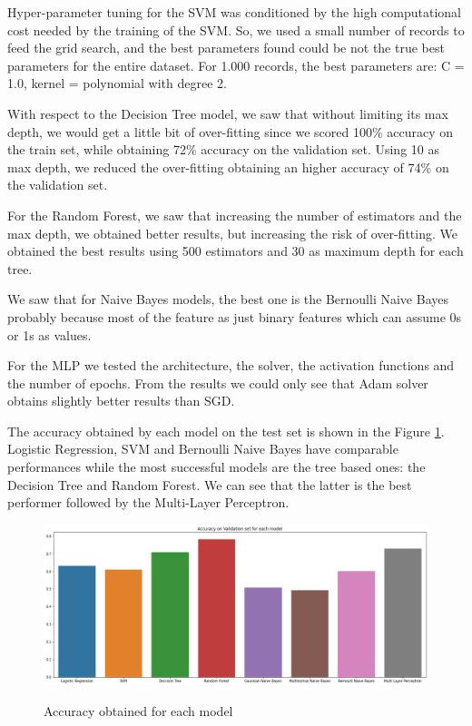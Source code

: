\documentclass{article}
\begin{document}
Hyper-parameter tuning for the SVM was conditioned by the high computational cost needed by the training of the SVM. So, we used a small number of records to feed the grid search, and the best parameters found could be not the true best parameters for the entire dataset. For 1.000 records, the best parameters are: C = 1.0, kernel = polynomial with degree 2.

With respect to the Decision Tree model, we saw that without limiting its max depth, we would get a little bit of over-fitting since we scored 100\% accuracy on the train set, while obtaining 72\% accuracy on the validation set. Using 10 as max depth, we reduced the over-fitting obtaining an higher accuracy of 74\% on the validation set.

For the Random Forest, we saw that increasing the number of estimators and the max depth, we obtained better results, but increasing the risk of over-fitting. We obtained the best results using 500 estimators and 30 as maximum depth for each tree.

We saw that for Naive Bayes models, the best one is the Bernoulli Naive Bayes probably because most of the feature as just binary features which can assume 0s or 1s as values.

For the MLP we tested the architecture, the solver, the activation functions and the number of epochs. From the results we could only see that Adam solver obtains slightly better results than SGD.

The accuracy obtained by each model on the test set is shown in the Figure \ref{img:accuracy}. Logistic Regression, SVM and Bernoulli Naive Bayes have comparable performances while the most successful models are the tree based ones: the Decision Tree and Random Forest. We can see that the latter is the best performer followed by the Multi-Layer Perceptron.

\begin{figure}[h!]
\centering
\includegraphics[width=\textwidth]{accuracy-valset}
\label{img:accuracy}
\caption{Accuracy obtained for each model}
\end{figure}
\end{document}
